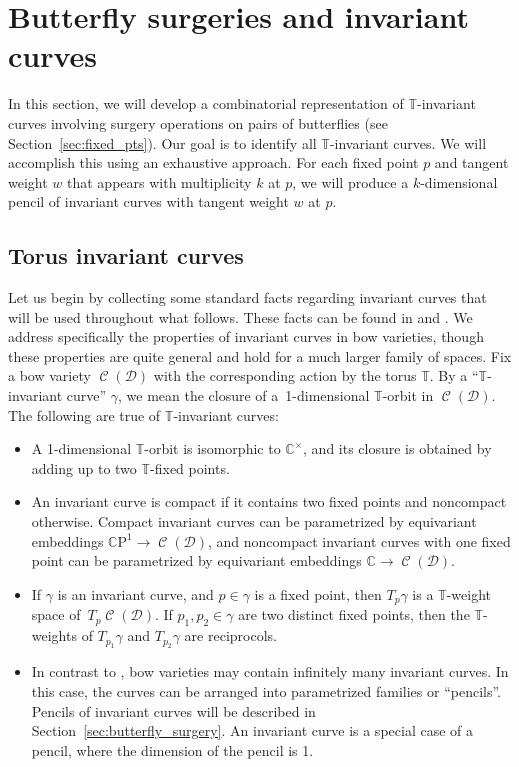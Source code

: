 \documentclass[pdftex]{sigma}
\numberwithin{equation}{section}
\newcommand{\brane}{\mathcal D}
\newcommand{\CC}{\mathbb C}
\newcommand{\CCP}{\mathbb C \mathrm{P}}
\newcommand{\torus}{\mathbb T}
\DeclareMathOperator{\bowvar}{\mathcal C}
\begin{document}
\section{Butterfly surgeries and invariant curves} \label{sec:curves}
In this section, we will develop a combinatorial representation of $\torus$-invariant curves involving surgery operations on pairs of butterflies (see Section~\ref{sec:fixed_pts}). Our goal is to identify all $\torus$-invariant curves. We will accomplish this using an exhaustive approach. For each fixed point $p$ and tangent weight $w$ that appears with multiplicity $k$ at $p$, we will produce a $k$-dimensional pencil of invariant curves with tangent weight $w$ at $p$.


\subsection{Torus invariant curves} \label{sec:invariant_curves}
Let us begin by collecting some standard facts regarding invariant curves that will be used throughout what follows. These facts can be found in \cite[Section~7]{GKM} and \cite[Section~7.2]{equiv_coh}. We address specifically the properties of invariant curves in bow varieties, though these properties are quite general and hold for a much larger family of spaces. Fix a bow variety $\bowvar(\brane)$ with the corresponding action by the torus $\torus$. By a ``$\torus$-invariant curve'' $\gamma$, we mean the closure of a~1-dimensional $\torus$-orbit in $\bowvar(\brane)$. The following are true of $\torus$-invariant curves:
\begin{itemize}\itemsep=0pt
\item A 1-dimensional $\torus$-orbit is isomorphic to $\CC^\times$, and its closure is obtained by adding up to two $\torus$-fixed points.
\item An invariant curve is compact if it contains two fixed points and noncompact otherwise. Compact invariant curves can be parametrized by equivariant embeddings $\CCP^1 \to \bowvar(\brane)$, and noncompact invariant curves with one fixed point can be parametrized by equivariant embeddings $\CC \to \bowvar(\brane)$.
\item If $\gamma$ is an invariant curve, and $p \in \gamma$ is a fixed point, then $T_p \gamma$ is a $\torus$-weight space of~$T_p \bowvar(\brane)$. If $p_1, p_2 \in \gamma$ are two distinct fixed points, then the $\torus$-weights of $T_{p_1}\gamma$ and $T_{p_2}\gamma$ are reciprocols.
\item In contrast to \cite{GKM}, bow varieties may contain infinitely many invariant curves. In this case, the curves can be arranged into parametrized families or ``pencils''. Pencils of invariant curves will be described in Section~\ref{sec:butterfly_surgery}. An invariant curve is a special case of a pencil, where the dimension of the pencil is 1.
\end{itemize}
\end{document}
